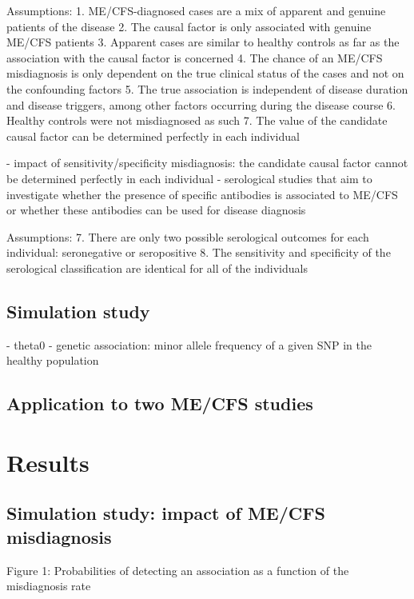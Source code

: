Assumptions:
    1. ME/CFS-diagnosed cases are a mix of apparent and genuine patients of the disease
    2. The causal factor is only associated with genuine ME/CFS patients
    3. Apparent cases are similar to healthy controls as far as the association with the causal factor is concerned
    4. The chance of an ME/CFS misdiagnosis is only dependent on the true clinical status of the cases and not on the confounding factors
    5. The true association is independent of disease duration and disease triggers, among other factors occurring during the disease course
    6. Healthy controls were not misdiagnosed as such
    7. The value of the candidate causal factor can be determined perfectly in each individual

- impact of sensitivity/specificity misdiagnosis: the candidate causal factor cannot be determined perfectly in each individual
    - serological studies that aim to investigate whether the presence of specific antibodies is associated to ME/CFS \citep{ruiz-pablos2021EpsteinBarrVirus} or whether these antibodies can be used for disease diagnosis \citep{sepulveda2022RevisitingIgG}

Assumptions:
    7. There are only two possible serological outcomes for each individual: seronegative or seropositive
    8. The sensitivity and specificity of the serological classification are identical for all of the individuals


\subsection{Simulation study}

- theta0
    - genetic association: minor allele frequency of a given SNP in the healthy population


\subsection{Application to two ME/CFS studies}


\section{Results}

\subsection{Simulation study: impact of ME/CFS misdiagnosis}

Figure 1: Probabilities of detecting an association as a function of the misdiagnosis rate

